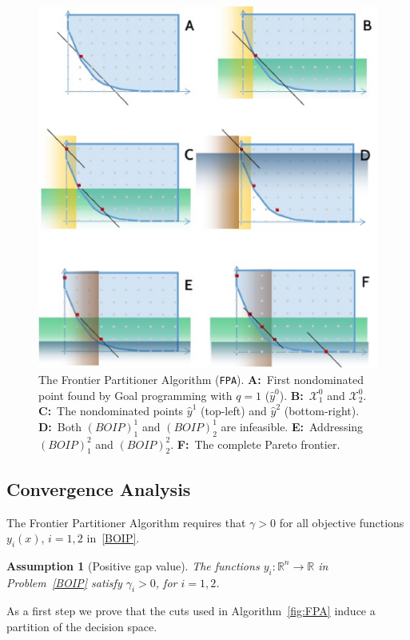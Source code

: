 \documentclass[preprint,12pt]{elsarticle}
\newtheorem{assumption}[theorem]{Assumption}
\def\R{\mathbb{R}}
\begin{document}
\begin{figure}
\caption{The Frontier Partitioner Algorithm (\texttt{FPA}). \textbf{A:}~First nondominated point found by Goal programming with $q=1$ ($\hat y^0$). \textbf{B:}~$\mathcal{X}^0_1$ and $\mathcal{X}^0_2$.
\textbf{C:}~The nondominated points $\hat y^1$ (top-left) and $\hat y^2$ (bottom-right).
\textbf{D:}~Both $(BOIP)^1_1$ and $(BOIP)^1_2$ are infeasible.
\textbf{E:}~Addressing $(BOIP)^2_1$ and $(BOIP)^2_2$. \textbf{F:}~The complete Pareto frontier.}
\label{fig:example}
\includegraphics[scale=1]{example.eps}
\end{figure}







\subsection{Convergence Analysis}\label{sec:conv}
The Frontier Partitioner Algorithm requires that $\gamma>0$ for all objective functions $y_i(x)$, $i=1,2$ in~\eqref{BOIP}.

\begin{assumption}[Positive gap value]\label{ass:gamma}
The functions $y_i:\R^n\rightarrow \R$ in Problem~\eqref{BOIP} satisfy $\gamma_i>0$, for $i=1,2$.
\end{assumption}
As a first step we prove that the cuts used in Algorithm~\ref{fig:FPA} induce a partition of the decision space.
\end{document}
